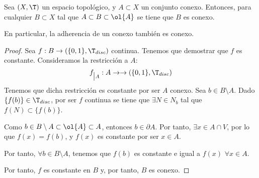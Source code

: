 \begin{teo}
    Sea $(X,\T)$ un espacio topológico, y $A\subset X$ un conjunto conexo. Entonces, para cualquier $B\subset X$ tal que $A\subset B\subset \ol{A}$ se tiene que $B$ es conexo.

    En particular, la adherencia de un conexo también es conexo.
\end{teo}
\begin{proof}
    Sea $f:B\to (\{0,1\},\T_{disc})$ continua. Tenemos que demostrar que $f$ es constante. Consideramos la restricción a $A$:
    \begin{equation*}
        f_{\big| A}: A\to \to (\{0,1\},\T_{disc})
    \end{equation*}
    Tenemos que dicha restricción es constante por ser $A$ conexo. Sea $b\in B\setminus A$. Dado $\{f(b)\}\in \T_{disc}$, por ser $f$ continua se tiene que $\exists N\in N_b$ tal que $f(N)\subset \{f(b)\}$.

    Como $b\in B\setminus A \subset \ol{A}\subset A$, entonces $b\in \partial A$. Por tanto, $\exists x\in A\cap V$, por lo que $f(x)=f(b)$, y $f(x)$ es constante por ser $x\in A$.

    Por tanto, $\forall b\in B\setminus A$, tenemos que $f(b)$ es constante e igual a $f(x)$ $\forall x\in A$.

    Por tanto, $f$ es constante en $B$ y, por tanto, $B$ es conexo.
\end{proof}


